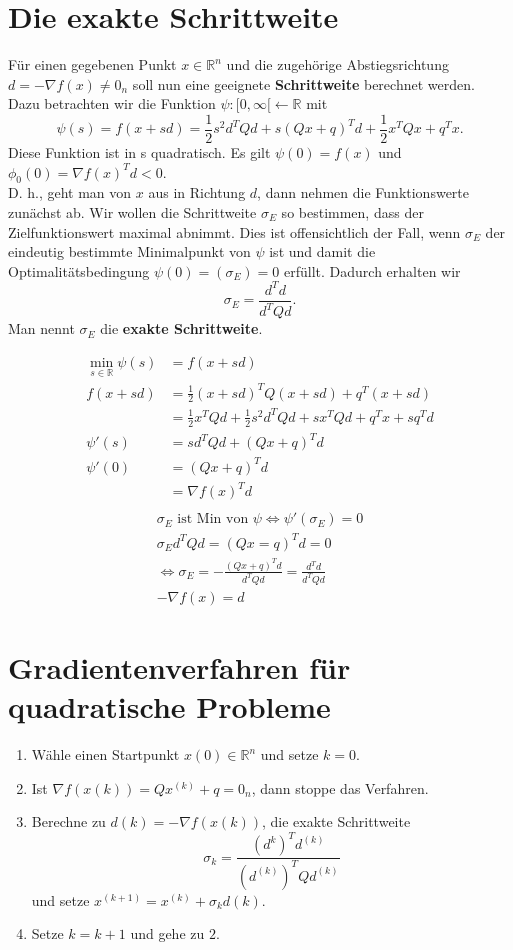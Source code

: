 \section{Die exakte Schrittweite}
Für einen gegebenen Punkt $x \in \mathbb{R}^n$ und die zugehörige Abstiegsrichtung $d = -\nabla f(x) \neq 0_n$ soll nun eine geeignete \textbf{Schrittweite} berechnet werden. \\
Dazu betrachten wir die Funktion $ \psi:[0, \infty[ \leftarrow \mathbb{R}$ mit $$ \psi(s) = f(x+sd) = \frac{1}{2}s^2d^TQd + s(Qx+q)^Td+\frac{1}{2}x^TQx+q^Tx.$$
Diese Funktion ist in s quadratisch. Es gilt $\psi(0) = f(x)$ und $\phi_0(0) = \nabla f(x)^Td < 0$.\\
D. h., geht man von $x$ aus in Richtung $d$, dann nehmen die Funktionswerte zunächst ab.
Wir wollen die Schrittweite $\sigma_E$ so bestimmen, dass der Zielfunktionswert maximal abnimmt. Dies ist offensichtlich der Fall, wenn $\sigma_E$ der eindeutig
bestimmte Minimalpunkt von $\psi$ ist und damit die Optimalitätsbedingung $\psi(0) = (\sigma_E) = 0$ erfüllt. Dadurch erhalten wir
$$ \sigma_E = \frac{d^Td}{d^TQd}.$$
Man nennt $\sigma_E$ die \textbf{exakte Schrittweite}.

\begin{equation}
\begin{aligned}
	\min_{s\in \mathbb{R}} \psi(s) &= f(x+sd) \\
	f(x+sd) & = \frac{1}{2}(x+sd)^TQ(x+sd)+q^T(x+sd)\\
	& = \frac{1}{2}x^TQd+\frac{1}{2}s^2d^TQd+sx^TQd+q^Tx+sq^Td \\
	\psi'(s) &= sd^TQd+(Qx+q)^Td \\
	\psi'(0)&= (Qx+q)^Td \\ 
	&= \nabla f(x)^Td \\
\end{aligned}
\end{equation}
\begin{equation}
\begin{aligned}
	\sigma_E\text{ ist Min von }\psi \Leftrightarrow \psi'(\sigma_E) = 0\\
	\sigma_Ed^TQd=(Qx=q)^Td = 0 \\
	\Leftrightarrow \sigma_E = - \frac{(Qx+q)^Td}{d^TQd} = \frac{d^Td}{d^TQd}\\
	-\nabla f(x) = d
\end{aligned}
\end{equation}

\section{Gradientenverfahren für quadratische Probleme}
\begin{enumerate}
	\item Wähle einen Startpunkt $x(0) \in \mathbb{R}^n$ und setze $k = 0$.
	\item Ist $\nabla f(x(k)) = Qx^{(k)} + q = 0_n$, dann stoppe das Verfahren.
	\item Berechne zu $d(k) = -\nabla f(x(k))$, die exakte Schrittweite $$\sigma_k = \frac{(d^{k})^Td^{(k)}}{(d^{(k)})^TQd^{(k)}}$$
	und setze $x^{(k+1)} = x^{(k)} + \sigma_kd(k)$.
	\item  Setze $k = k + 1$ und gehe zu $2$.	
\end{enumerate}
